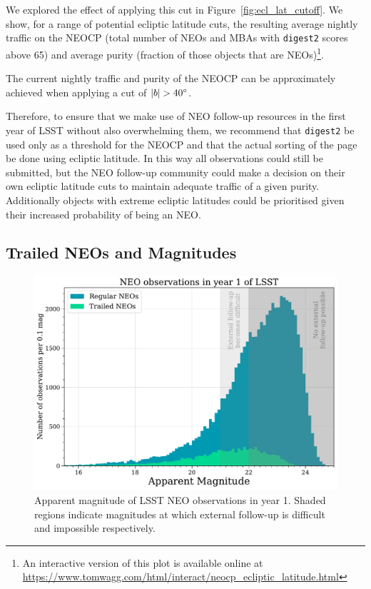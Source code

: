 \documentclass[twocolumn]{aastex631}
\newcommand{\dig}{\texttt{digest2}}
\begin{document}
We explored the effect of applying this cut in Figure~\ref{fig:ecl_lat_cutoff}. We show, for a range of potential ecliptic latitude cuts, the resulting average nightly traffic on the NEOCP (total number of NEOs and MBAs with \dig{} scores above 65) and average purity (fraction of those objects that are NEOs)\footnote{An interactive version of this plot is available online at \url{https://www.tomwagg.com/html/interact/neocp_ecliptic_latitude.html}}.

The current nightly traffic and purity of the NEOCP can be approximately achieved when applying a cut of $\abs{b} > 40^\circ$.

Therefore, to ensure that we make use of NEO follow-up resources in the first year of LSST without also overwhelming them, we recommend that \dig{} be used only as a threshold for the NEOCP and that the actual sorting of the page be done using ecliptic latitude. In this way all observations could still be submitted, but the NEO follow-up community could make a decision on their own ecliptic latitude cuts to maintain adequate traffic of a given purity. Additionally objects with extreme ecliptic latitudes could be prioritised given their increased probability of being an NEO.

\subsection{Trailed NEOs and Magnitudes}\label{sec:trailed_neos}

\begin{figure}[tb]
    \centering
    \includegraphics[width=\columnwidth]{figures/neo_magnitudes.pdf}
    \caption{Apparent magnitude of LSST NEO observations in year 1. Shaded regions indicate magnitudes at which external follow-up is difficult and impossible respectively.}
    \label{fig:neo_magnitudes}
\end{figure}
\end{document}
